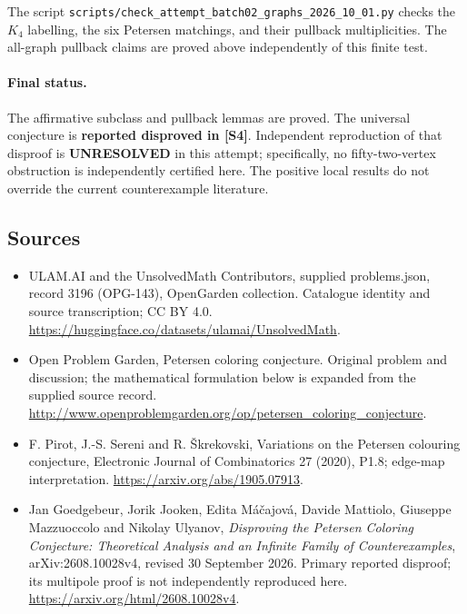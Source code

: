 \documentclass[11pt,a4paper]{article}
\begin{document}
The script \texttt{scripts/check\_attempt\_batch02\_graphs\_2026\_10\_01.py} checks the $K_4$ labelling, the six Petersen matchings, and their pullback multiplicities. The all-graph pullback claims are proved above independently of this finite test.

\paragraph{Final status.}
The affirmative subclass and pullback lemmas are proved. The universal conjecture is \textbf{reported disproved in [S4]}. Independent reproduction of that disproof is \textbf{UNRESOLVED} in this attempt; specifically, no fifty-two-vertex obstruction is independently certified here. The positive local results do not override the current counterexample literature.

\subsection{Sources}
\begin{itemize}
\item[S1] ULAM.AI and the UnsolvedMath Contributors, supplied problems.json, record 3196 (OPG-143), OpenGarden collection. Catalogue identity and source transcription; CC BY 4.0.
\url{https://huggingface.co/datasets/ulamai/UnsolvedMath}.
\item[S2] Open Problem Garden, Petersen coloring conjecture. Original problem and discussion; the mathematical formulation below is expanded from the supplied source record.
\url{http://www.openproblemgarden.org/op/petersen_coloring_conjecture}.
\item[S3] F. Pirot, J.-S. Sereni and R. Škrekovski, Variations on the Petersen colouring conjecture, Electronic Journal of Combinatorics 27 (2020), P1.8; edge-map interpretation.
\url{https://arxiv.org/abs/1905.07913}.
\item[S4] Jan Goedgebeur, Jorik Jooken, Edita M\'a\v cajov\'a, Davide Mattiolo, Giuseppe Mazzuoccolo and Nikolay Ulyanov, \emph{Disproving the Petersen Coloring Conjecture: Theoretical Analysis and an Infinite Family of Counterexamples}, arXiv:2608.10028v4, revised 30 September 2026. Primary reported disproof; its multipole proof is not independently reproduced here.
\url{https://arxiv.org/html/2608.10028v4}.
\end{itemize}
\end{document}
